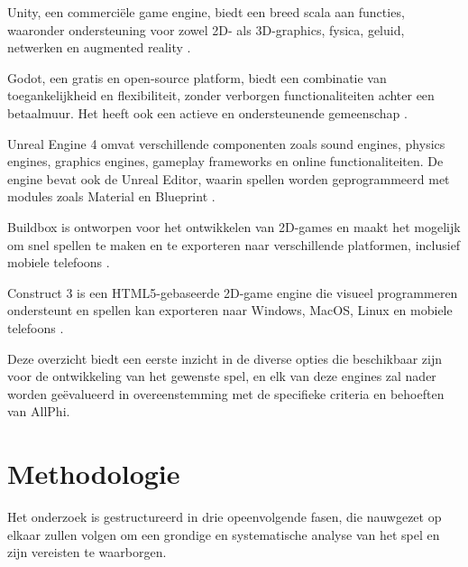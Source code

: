 Unity, een commerciële game engine, biedt een breed scala aan functies, waaronder ondersteuning voor zowel 2D- als 3D-graphics, fysica, geluid, netwerken en augmented reality \autocite{Haas2014}.

Godot, een gratis en open-source platform, biedt een combinatie van toegankelijkheid en flexibiliteit, zonder verborgen functionaliteiten achter een betaalmuur. Het heeft ook een actieve en ondersteunende gemeenschap \autocite{Bradfield2018}.

Unreal Engine 4 omvat verschillende componenten zoals sound engines, physics engines, graphics engines, gameplay frameworks en online functionaliteiten. De engine bevat ook de Unreal Editor, waarin spellen worden geprogrammeerd met modules zoals Material en Blueprint \autocite{lee2016learning}.

Buildbox is ontworpen voor het ontwikkelen van 2D-games en maakt het mogelijk om snel spellen te maken en te exporteren naar verschillende platformen, inclusief mobiele telefoons \cite{audronis2016buildbox}.

Construct 3 is een HTML5-gebaseerde 2D-game engine die visueel programmeren ondersteunt en spellen kan exporteren naar Windows, MacOS, Linux en mobiele telefoons \cite{enwiki:1200994136}.

Deze overzicht biedt een eerste inzicht in de diverse opties die beschikbaar zijn voor de ontwikkeling van het gewenste spel, en elk van deze engines zal nader worden geëvalueerd in overeenstemming met de specifieke criteria en behoeften van AllPhi.







\section{Methodologie}
\label{sec:methodologie}

Het onderzoek is gestructureerd in drie opeenvolgende fasen, die nauwgezet op elkaar zullen volgen om een grondige en systematische analyse van het spel en zijn vereisten te waarborgen.

